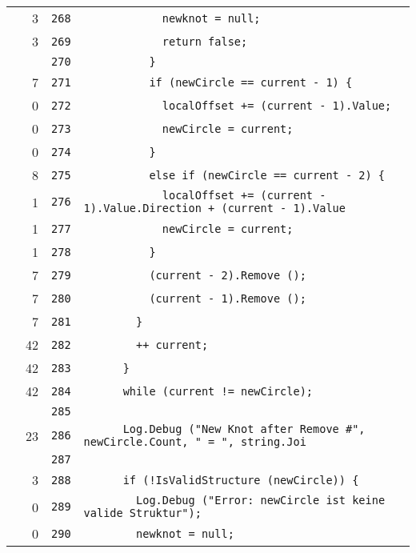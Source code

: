 \documentclass[a4paper,10pt]{article}
\begin{document}
\begin{longtable}[l]{lrrl}
\cellcolor{green} & 3 & \verb~268~ & \verb~            newknot = null;~\\
\cellcolor{green} & 3 & \verb~269~ & \verb~            return false;~\\
\cellcolor{gray} &  & \verb~270~ & \verb~          }~\\
\cellcolor{green} & 7 & \verb~271~ & \verb~          if (newCircle == current - 1) {~\\
\cellcolor{red} & 0 & \verb~272~ & \verb~            localOffset += (current - 1).Value;~\\
\cellcolor{red} & 0 & \verb~273~ & \verb~            newCircle = current;~\\
\cellcolor{red} & 0 & \verb~274~ & \verb~          }~\\
\cellcolor{green} & 8 & \verb~275~ & \verb~          else if (newCircle == current - 2) {~\\
\cellcolor{green} & 1 & \verb~276~ & \verb~            localOffset += (current - 1).Value.Direction + (current - 1).Value~\\
\cellcolor{green} & 1 & \verb~277~ & \verb~            newCircle = current;~\\
\cellcolor{green} & 1 & \verb~278~ & \verb~          }~\\
\cellcolor{green} & 7 & \verb~279~ & \verb~          (current - 2).Remove ();~\\
\cellcolor{green} & 7 & \verb~280~ & \verb~          (current - 1).Remove ();~\\
\cellcolor{green} & 7 & \verb~281~ & \verb~        }~\\
\cellcolor{green} & 42 & \verb~282~ & \verb~        ++ current;~\\
\cellcolor{green} & 42 & \verb~283~ & \verb~      }~\\
\cellcolor{green} & 42 & \verb~284~ & \verb~      while (current != newCircle);~\\
\cellcolor{gray} &  & \verb~285~ & \verb~~\\
\cellcolor{green} & 23 & \verb~286~ & \verb~      Log.Debug ("New Knot after Remove #", newCircle.Count, " = ", string.Joi~\\
\cellcolor{gray} &  & \verb~287~ & \verb~~\\
\cellcolor{green} & 3 & \verb~288~ & \verb~      if (!IsValidStructure (newCircle)) {~\\
\cellcolor{red} & 0 & \verb~289~ & \verb~        Log.Debug ("Error: newCircle ist keine valide Struktur");~\\
\cellcolor{red} & 0 & \verb~290~ & \verb~        newknot = null;~\\

\end{longtable}
\end{document}
